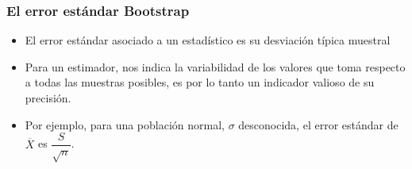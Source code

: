 \subsubsection{El error estándar Bootstrap}
\begin{tcolorbox}[colback=blue!5!white, colframe=blue!75!black, title=\textbf{Recordad:}]
\begin{itemize}[label=\textbullet]
    \item El error estándar asociado a un estadístico es su desviación típica muestral
    \item Para un estimador, nos indica la variabilidad de los valores que toma respecto a todas las muestras posibles, es por lo tanto un indicador valioso de su precisión.
    \item Por ejemplo, para una población normal, $\sigma$ desconocida, el error estándar de $\overline{X}$ es $\dfrac{S}{\sqrt{n} }$.
\end{itemize}
\end{tcolorbox}
